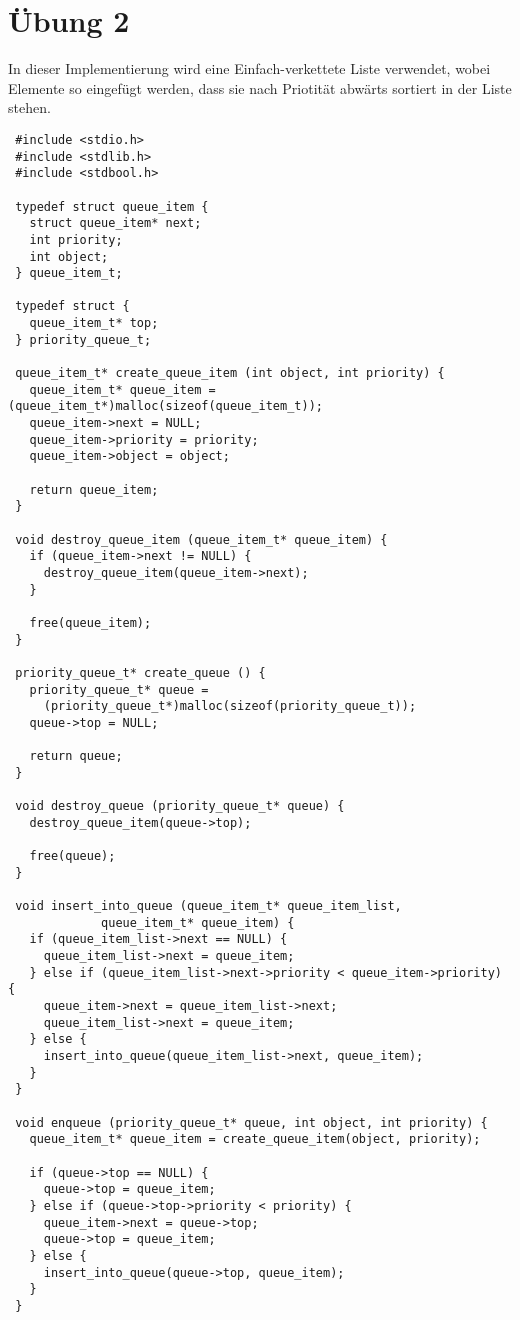 \documentclass[a4paper,10pt]{article}
\begin{document}
\section*{Übung 2}

In dieser Implementierung wird eine Einfach-verkettete Liste verwendet, wobei Elemente so eingefügt werden, dass sie nach Priotität abwärts sortiert in der Liste stehen.
\begin{lstlisting}
 #include <stdio.h>
 #include <stdlib.h>
 #include <stdbool.h>

 typedef struct queue_item {
   struct queue_item* next;
   int priority;
   int object;
 } queue_item_t;

 typedef struct {
   queue_item_t* top;
 } priority_queue_t;

 queue_item_t* create_queue_item (int object, int priority) {
   queue_item_t* queue_item = (queue_item_t*)malloc(sizeof(queue_item_t));
   queue_item->next = NULL;
   queue_item->priority = priority;
   queue_item->object = object;
   
   return queue_item;
 }

 void destroy_queue_item (queue_item_t* queue_item) {
   if (queue_item->next != NULL) {
     destroy_queue_item(queue_item->next);
   }
   
   free(queue_item);
 }

 priority_queue_t* create_queue () {
   priority_queue_t* queue =
     (priority_queue_t*)malloc(sizeof(priority_queue_t));
   queue->top = NULL;
   
   return queue;
 }

 void destroy_queue (priority_queue_t* queue) {
   destroy_queue_item(queue->top);
   
   free(queue);
 }

 void insert_into_queue (queue_item_t* queue_item_list,
			 queue_item_t* queue_item) {
   if (queue_item_list->next == NULL) {
     queue_item_list->next = queue_item;
   } else if (queue_item_list->next->priority < queue_item->priority) {
     queue_item->next = queue_item_list->next;
     queue_item_list->next = queue_item;
   } else {
     insert_into_queue(queue_item_list->next, queue_item);
   }
 }

 void enqueue (priority_queue_t* queue, int object, int priority) {
   queue_item_t* queue_item = create_queue_item(object, priority);
   
   if (queue->top == NULL) {
     queue->top = queue_item;
   } else if (queue->top->priority < priority) {
     queue_item->next = queue->top;
     queue->top = queue_item;
   } else {
     insert_into_queue(queue->top, queue_item);
   }
 }


\end{lstlisting}
\end{document}
